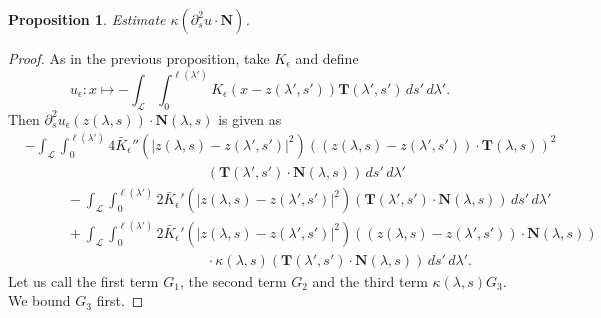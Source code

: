 \documentclass[reqno,centertags,12pt]{amsart}
\newtheorem{proposition}[theorem]{Proposition}
\theoremstyle{definition}
\numberwithin{equation}{section}
\newcommand{\abs}[1]{\left\lvert#1\right\rvert}
\begin{document}
\begin{proposition}
    Estimate $\kappa(\partial_{s}^{2}u\cdot\mathbf{N})$.
\end{proposition}

\begin{proof}
    As in the previous proposition, take $K_{\epsilon}$ and define
    \[
        u_{\epsilon}\colon x\mapsto -\int_{\mathcal{L}}\int_{0}^{\ell(\lambda')}
        K_{\epsilon}(x-z(\lambda',s'))\mathbf{T}(\lambda',s')\,ds'\,d\lambda'.
    \]
    Then $\partial_{s}^{2}u_{\epsilon}(z(\lambda,s))\cdot\mathbf{N}(\lambda,s)$
    is given as
    \begin{align*}
        &-\int_{\mathcal{L}}\int_{0}^{\ell(\lambda')}
        4\bar{K}_{\epsilon}''\left(\abs{z(\lambda,s) - z(\lambda',s')}^{2}\right)
        \left((z(\lambda,s) - z(\lambda',s'))\cdot\mathbf{T}(\lambda,s)\right)^{2}
        \\&\quad\quad\quad\quad\quad\quad\quad\quad\quad\quad\quad\quad\quad
        \left(\mathbf{T}(\lambda',s')\cdot\mathbf{N}(\lambda,s)\right)\,ds'\,d\lambda' \\
        &\quad\quad\quad
        - \int_{\mathcal{L}}\int_{0}^{\ell(\lambda')}
        2\bar{K}_{\epsilon}'\left(\abs{z(\lambda,s) - z(\lambda',s')}^{2}\right)
        \left(\mathbf{T}(\lambda',s')\cdot\mathbf{N}(\lambda,s)\right)\,ds'\,d\lambda' \\
        &\quad\quad\quad
        + \int_{\mathcal{L}}\int_{0}^{\ell(\lambda')}
        2\bar{K}_{\epsilon}'\left(\abs{z(\lambda,s) - z(\lambda',s')}^{2}\right)
        \left((z(\lambda,s) - z(\lambda',s'))\cdot\mathbf{N}(\lambda,s)\right)
        \\&\quad\quad\quad\quad\quad\quad\quad\quad\quad\quad\quad\quad\quad
        \cdot\kappa(\lambda,s)
        \left(\mathbf{T}(\lambda',s')\cdot\mathbf{N}(\lambda,s)\right)\,ds'\,d\lambda'.
    \end{align*}
    Let us call the first term $G_{1}$, the second term $G_{2}$ and the third term
    $\kappa(\lambda,s)G_{3}$. We bound $G_{3}$ first.


\end{proof}
\end{document}
